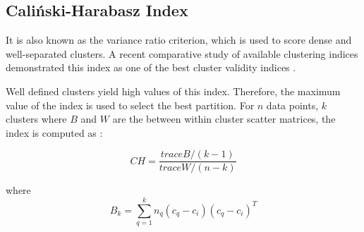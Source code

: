 \documentclass[../UNBThesis2.tex]{subfiles}
\begin{document}
    

\subsection{ Caliński-Harabasz Index}
It is also known as the variance ratio criterion, which is used to score dense and well-separated clusters. A recent comparative study of available clustering indices demonstrated this index as one of the best cluster validity indices \cite{arbelaitz2013extensive}. 

Well defined clusters yield high values of this index. Therefore, the maximum value of the index is used to select the best partition. For \begin{math} n \end{math} data points, \begin{math} k \end{math} clusters  where \begin{math} B \end{math} and \begin{math} W \end{math} are the between within cluster scatter matrices, the index is computed as \cite{calinski1974dendrite}:


\begin{equation}
  CH =  \frac{traceB / (k - 1)} {traceW/ (n -k)}
\end{equation}   



where
\begin{equation}
    B_k = \sum_{q=1}^k n_q (c_q - c_i) (c_q - c_i)^T
\end{equation}
\end{document}

